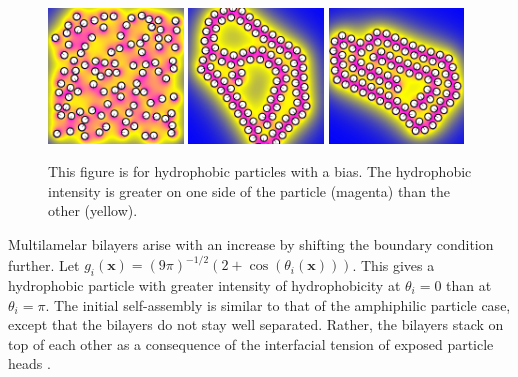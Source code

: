 \begin{figure}[h!]
  \begin{center}
    \includegraphics[width=0.32\textwidth]{figures/SpecificAim1/N100C1.pdf}
    \includegraphics[width=0.32\textwidth]{figures/SpecificAim1/N100C2.pdf}
    \includegraphics[width=0.32\textwidth]{figures/SpecificAim1/N100C3.pdf}\\
    \caption{This figure is for hydrophobic particles with a bias. The
      hydrophobic intensity is greater on one side of the particle (magenta)
      than the other (yellow).
    \label{fig:self-assemblyA}}
\end{center}
\end{figure}

Multilamelar bilayers arise with an increase by shifting the boundary condition
further. Let $g_i(\mathbf{x}) = (9\pi )^{-1/2}(2 + \cos(\theta_i(\mathbf{x})))$.
This gives a hydrophobic particle with greater intensity of hydrophobicity
at $\theta_i = 0$ than at $\theta_i = \pi$.  The initial self-assembly
is similar to that of the amphiphilic particle case, except that the bilayers
do not stay well separated.  Rather, the bilayers stack on top of each
other as a consequence of the interfacial tension of exposed particle heads \cite{deMeetal21}. 


